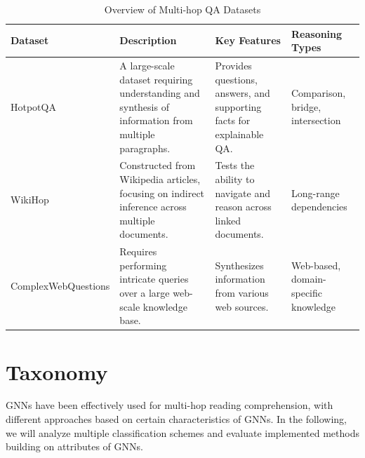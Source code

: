 \documentclass[sigplan,screen,nonacm]{acmart}
\begin{document}
\begin{table}[ht]
  \centering
  \caption{Overview of Multi-hop QA Datasets}

  \begin{tabular}{|p{4cm}|p{4cm}|p{4cm}|p{4cm}|}
  \hline
  \textbf{Dataset} & \textbf{Description} & \textbf{Key Features} & \textbf{Reasoning Types} \\ \hline
  HotpotQA \cite{RN116} & A large-scale dataset requiring understanding and synthesis of information from multiple paragraphs. & Provides questions, answers, and supporting facts for explainable QA. & Comparison, bridge, intersection \\ \hline
  WikiHop \cite{RN115} & Constructed from Wikipedia articles, focusing on indirect inference across multiple documents. & Tests the ability to navigate and reason across linked documents. & Long-range dependencies \\ \hline
  ComplexWebQuestions \cite{RN104} & Requires performing intricate queries over a large web-scale knowledge base. & Synthesizes information from various web sources. & Web-based, domain-specific knowledge \\ \hline
  \end{tabular}
  
  \label{table:multihop_datasets}
  \end{table}
  
  
\section{Taxonomy}
GNNs have been effectively used for multi-hop reading comprehension, with different approaches based on certain characteristics of GNNs. In
the following, we will analyze multiple classification schemes and evaluate implemented methods building on attributes of GNNs. 
\end{document}

